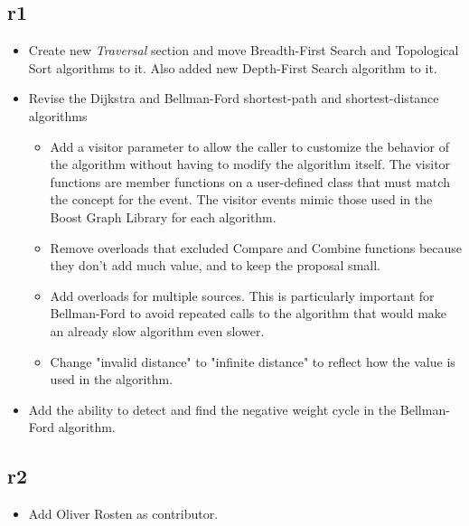 \subsection*{\paperno r1}
\begin{itemize}
      \item Create new \textit{Traversal} section and move Breadth-First Search and Topological Sort algorithms to it.
            Also added new Depth-First Search algorithm to it.
      \item Revise the Dijkstra and Bellman-Ford shortest-path and shortest-distance algorithms
            \begin{itemize}
                  \item Add a visitor parameter to allow the caller to
                        customize the behavior of the algorithm without having to modify the algorithm itself.
                        The visitor functions are member functions on a user-defined class that must match the concept for the event.
                        The visitor events mimic those used in the Boost Graph Library for each algorithm.
                  \item Remove overloads that excluded Compare and Combine functions because they don't add much value,
                        and to keep the proposal small.
                  \item Add overloads for multiple sources. This is particularly important for Bellman-Ford to avoid
                        repeated calls to the algorithm that would make an already slow algorithm even slower.
                  \item Change "invalid distance" to "infinite distance" to reflect how the value is used 
                        in the algorithm.
            \end{itemize}
      \item Add the ability to detect and find the negative weight cycle in the Bellman-Ford algorithm.
\end{itemize}

\subsection*{\paperno r2}
\begin{itemize}
      \item Add Oliver Rosten as contributor.
\end{itemize}
